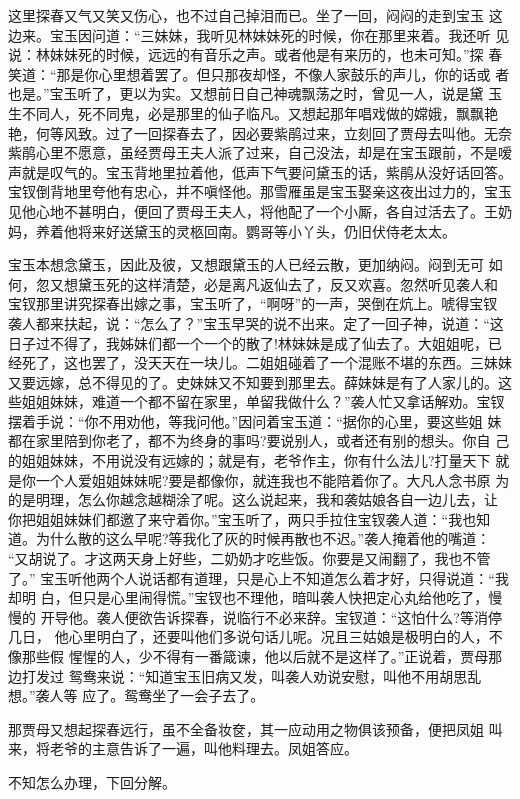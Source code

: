 这里探春又气又笑又伤心，也不过自己掉泪而已。坐了一回，闷闷的走到宝玉
这边来。宝玉因问道：“三妹妹，我听见林妹妹死的时候，你在那里来着。我还听
见说：林妹妹死的时候，远远的有音乐之声。或者他是有来历的，也未可知。”探
春笑道：“那是你心里想着罢了。但只那夜却怪，不像人家鼓乐的声儿，你的话或
者也是。”宝玉听了，更以为实。又想前日自己神魂飘荡之时，曾见一人，说是黛
玉生不同人，死不同鬼，必是那里的仙子临凡。又想起那年唱戏做的嫦娥，飘飘艳
艳，何等风致。过了一回探春去了，因必要紫鹃过来，立刻回了贾母去叫他。无奈
紫鹃心里不愿意，虽经贾母王夫人派了过来，自己没法，却是在宝玉跟前，不是嗳
声就是叹气的。宝玉背地里拉着他，低声下气要问黛玉的话，紫鹃从没好话回答。
宝钗倒背地里夸他有忠心，并不嗔怪他。那雪雁虽是宝玉娶亲这夜出过力的，宝玉
见他心地不甚明白，便回了贾母王夫人，将他配了一个小厮，各自过活去了。王奶
妈，养着他将来好送黛玉的灵柩回南。鹦哥等小丫头，仍旧伏侍老太太。

宝玉本想念黛玉，因此及彼，又想跟黛玉的人已经云散，更加纳闷。闷到无可
如何，忽又想黛玉死的这样清楚，必是离凡返仙去了，反又欢喜。忽然听见袭人和
宝钗那里讲究探春出嫁之事，宝玉听了，“啊呀”的一声，哭倒在炕上。唬得宝钗
袭人都来扶起，说：“怎么了？”宝玉早哭的说不出来。定了一回子神，说道：“这
日子过不得了，我姊妹们都一个一个的散了!林妹妹是成了仙去了。大姐姐呢，已
经死了，这也罢了，没天天在一块儿。二姐姐碰着了一个混账不堪的东西。三妹妹
又要远嫁，总不得见的了。史妹妹又不知要到那里去。薛妹妹是有了人家儿的。这
些姐姐妹妹，难道一个都不留在家里，单留我做什么？”袭人忙又拿话解劝。宝钗
摆着手说：“你不用劝他，等我问他。”因问着宝玉道：“据你的心里，要这些姐
妹都在家里陪到你老了，都不为终身的事吗?要说别人，或者还有别的想头。你自
己的姐姐妹妹，不用说没有远嫁的；就是有，老爷作主，你有什么法儿?打量天下
就是你一个人爱姐姐妹妹呢?要是都像你，就连我也不能陪着你了。大凡人念书原
为的是明理，怎么你越念越糊涂了呢。这么说起来，我和袭姑娘各自一边儿去，让
你把姐姐妹妹们都邀了来守着你。”宝玉听了，两只手拉住宝钗袭人道：“我也知
道。为什么散的这么早呢?等我化了灰的时候再散也不迟。”袭人掩着他的嘴道：
“又胡说了。才这两天身上好些，二奶奶才吃些饭。你要是又闹翻了，我也不管了。”
宝玉听他两个人说话都有道理，只是心上不知道怎么着才好，只得说道：“我却明
白，但只是心里闹得慌。”宝钗也不理他，暗叫袭人快把定心丸给他吃了，慢慢的
开导他。袭人便欲告诉探春，说临行不必来辞。宝钗道：“这怕什么?等消停几日，
他心里明白了，还要叫他们多说句话儿呢。况且三姑娘是极明白的人，不像那些假
惺惺的人，少不得有一番箴谏，他以后就不是这样了。”正说着，贾母那边打发过
鸳鸯来说：“知道宝玉旧病又发，叫袭人劝说安慰，叫他不用胡思乱想。”袭人等
应了。鸳鸯坐了一会子去了。

那贾母又想起探春远行，虽不全备妆奁，其一应动用之物俱该预备，便把凤姐
叫来，将老爷的主意告诉了一遍，叫他料理去。凤姐答应。

不知怎么办理，下回分解。